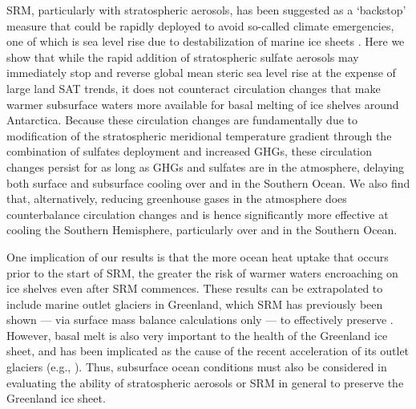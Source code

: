 \documentclass[grl]{AGUTeX}  %
\begin{document}
\begin{article}
SRM, particularly with stratospheric aerosols, has been suggested as a `backstop' measure that could be rapidly deployed to avoid so-called climate emergencies, one of which is sea level rise due to destabilization of marine ice sheets \citep{blackstock09}. Here we show that while the rapid addition of stratospheric sulfate aerosols may immediately stop and reverse global mean steric sea level rise at the expense of large land SAT trends, it does not counteract circulation changes that make warmer subsurface waters more available for basal melting of ice shelves around Antarctica. Because these circulation changes are fundamentally due to modification of the stratospheric meridional temperature gradient through the combination of sulfates deployment and increased GHGs, these circulation changes persist for as long as GHGs and sulfates are in the atmosphere, delaying both surface and subsurface cooling over and in the Southern Ocean. We also find that, alternatively, reducing greenhouse gases in the atmosphere does counterbalance circulation changes and is hence significantly more effective at cooling the Southern Hemisphere, particularly over and in the Southern Ocean. 


One implication of our results is that the more ocean heat uptake that occurs prior to the start of SRM, the greater the risk of warmer waters encroaching on ice shelves even after SRM commences. These results can be extrapolated to include marine outlet glaciers in Greenland, which SRM has previously been shown --- via surface mass balance calculations only --- to effectively preserve \citep{irvine09}. However, basal melt is also very important to the health of the Greenland ice sheet, and has been implicated as the cause of the recent acceleration of its outlet glaciers (e.g., \cite{dholland08}). Thus, subsurface ocean conditions must also be considered in evaluating the ability of stratospheric aerosols or SRM in general to preserve the Greenland ice sheet.


\end{article}
\end{document}

